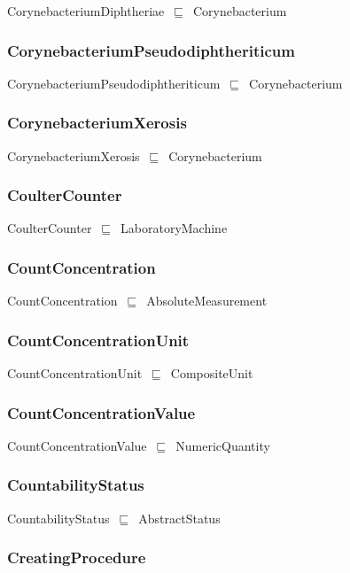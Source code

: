 \documentclass{article}
\begin{document}
CorynebacteriumDiphtheriae~\ensuremath{\sqsubseteq}~Corynebacterium~

\subsubsection*{CorynebacteriumPseudodiphtheriticum}

CorynebacteriumPseudodiphtheriticum~\ensuremath{\sqsubseteq}~Corynebacterium~

\subsubsection*{CorynebacteriumXerosis}

CorynebacteriumXerosis~\ensuremath{\sqsubseteq}~Corynebacterium~

\subsubsection*{CoulterCounter}

CoulterCounter~\ensuremath{\sqsubseteq}~LaboratoryMachine~

\subsubsection*{CountConcentration}

CountConcentration~\ensuremath{\sqsubseteq}~AbsoluteMeasurement~

\subsubsection*{CountConcentrationUnit}

CountConcentrationUnit~\ensuremath{\sqsubseteq}~CompositeUnit~

\subsubsection*{CountConcentrationValue}

CountConcentrationValue~\ensuremath{\sqsubseteq}~NumericQuantity~

\subsubsection*{CountabilityStatus}

CountabilityStatus~\ensuremath{\sqsubseteq}~AbstractStatus~

\subsubsection*{CreatingProcedure}
\end{document}
